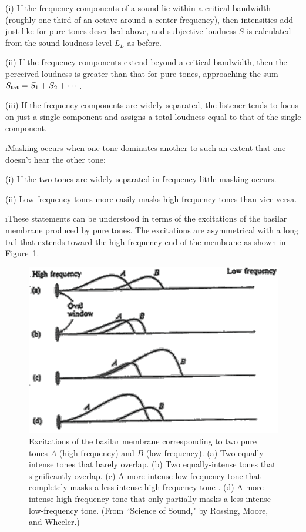 (i) If the frequency components of a sound lie 
within a 
critical bandwidth (roughly one-third of an octave 
around a center frequency), then intensities
add just like for pure tones described above,
and subjective loudness $S$ is calculated
from the sound loudness level $L_L$ as before.
 
(ii) If the frequency components extend beyond
a critical bandwidth, then the perceived loudness
is greater than that for pure tones, approaching
the sum $S_{\rm tot} = S_1+S_2+\cdots$.

(iii) If the frequency components are widely
separated, the listener tends to focus on just 
a single component and assigns a total loudness 
equal to that of the single component.

\i Masking occurs when one tone dominates another
to such an extent that one doesn't hear the other
tone:

(i) If the two tones are widely separated in frequency
little masking occurs. 

(ii) Low-frequency tones more easily masks high-frequency
tones than vice-versa.

\i These statements can be understood in terms of the 
excitations of the basilar membrane produced
by pure tones.
The excitations are asymmetrical with a long
tail that extends toward the high-frequency end
of the membrane as shown in Figure~\ref{f:asymmetry_masking}.
%
\begin{figure}[htbp]
\begin{center}
\includegraphics[width=.8\textwidth]{asymmetry_masking}
\caption{Excitations of the basilar membrane
corresponding to two pure tones $A$ (high frequency)
and $B$ (low frequency).
(a) Two equally-intense tones that barely overlap.
(b) Two equally-intense tones that significantly overlap.
(c) A more intense low-frequency tone that completely
masks a less intense high-frequency tone .
(d) A more intense high-frequency tone that only partially
masks a less intense low-frequency tone.
(From ``Science of Sound," by Rossing, Moore, and Wheeler.)}
\label{f:asymmetry_masking}
\end{center}
\end{figure}
%

